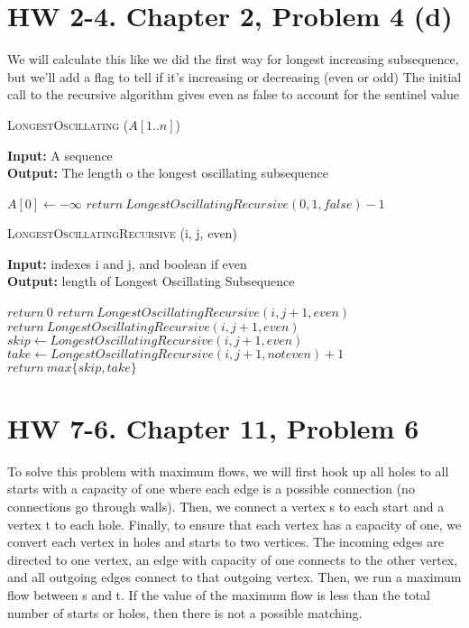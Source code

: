 \documentclass{article}
\begin{document}
\section{HW 2-4. Chapter 2, Problem 4 (d)}
We will calculate this like we did the first way for longest increasing subsequence, but we'll add a
flag to tell if it's increasing or decreasing (even or odd)
The initial call to the recursive algorithm gives even as false to account for the sentinel value

\begin{algorithm} \caption{\textsc{LongestOscillating} ($A[1..n]$)}\label{alg:seb}
    {\bf Input:} A sequence\\
    {\bf Output:} The length o the longest oscillating subsequence
    \begin{algorithmic}[1]
        \State$A[0] \gets - \infty$
        \State$return\ LongestOscillatingRecursive(0, 1, false) -1$
    \end{algorithmic}
\end{algorithm}

\begin{algorithm} \caption{\textsc{LongestOscillatingRecursive} (i, j, even)}\label{alg:seb}
    {\bf Input:} indexes i and j, and boolean if even\\
    {\bf Output:} length of Longest Oscillating Subsequence
    \begin{algorithmic}[1]
            \State$return\ 0$
                \State$return\ LongestOscillatingRecursive(i, j+1, even)$
            \EndIf{}
        \Else{}
                \State$return\ LongestOscillatingRecursive(i, j+1, even)$
            \EndIf{}
        \EndIf{}
        \State$skip \gets LongestOscillatingRecursive(i, j+1, even)$
        \State$take \gets LongestOscillatingRecursive(i, j+1, not even) +1$
        \State$return\ max\{skip, take\}$
    \end{algorithmic}
\end{algorithm}


\section{HW 7-6. Chapter 11, Problem 6}

To solve this problem with maximum flows, we will first hook up all holes to all starts
with a capacity of one where each edge is a possible connection (no connections go through walls). Then, we connect a vertex s to each start and a vertex t to each hole. Finally, to ensure that each vertex has a capacity of one, we convert each vertex in holes and starts to two vertices. The incoming edges are directed to one vertex, an edge with capacity of one connects to the other vertex, and all outgoing edges connect to that outgoing vertex. Then, we run a maximum flow between s and t. If the value of the maximum flow is less than the total number of starts or holes, then there is not a possible matching.
\end{document}
